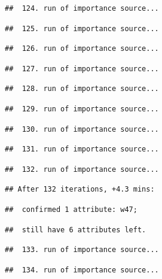 \documentclass[
]{article}
\begin{document}
\begin{verbatim}
##  124. run of importance source...
\end{verbatim}

\begin{verbatim}
##  125. run of importance source...
\end{verbatim}

\begin{verbatim}
##  126. run of importance source...
\end{verbatim}

\begin{verbatim}
##  127. run of importance source...
\end{verbatim}

\begin{verbatim}
##  128. run of importance source...
\end{verbatim}

\begin{verbatim}
##  129. run of importance source...
\end{verbatim}

\begin{verbatim}
##  130. run of importance source...
\end{verbatim}

\begin{verbatim}
##  131. run of importance source...
\end{verbatim}

\begin{verbatim}
##  132. run of importance source...
\end{verbatim}

\begin{verbatim}
## After 132 iterations, +4.3 mins:
\end{verbatim}

\begin{verbatim}
##  confirmed 1 attribute: w47;
\end{verbatim}

\begin{verbatim}
##  still have 6 attributes left.
\end{verbatim}

\begin{verbatim}
##  133. run of importance source...
\end{verbatim}

\begin{verbatim}
##  134. run of importance source...
\end{verbatim}
\end{document}

